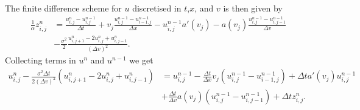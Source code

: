 \documentclass{article}  %
\begin{document}
The finite difference scheme for $u$ discretised in $t$,$x$, and $v$ is then given by 
%
\begin{align} 
    \frac{1}{\alpha}z^n_{i,j} &= \frac{u^n_{i,j}-u^{n-1}_{i,j}}{\Delta t} + v_j \frac{u^{n-1}_{i,j}-u^{n-1}_{i-1,j}}{\Delta x} - u^{n-1}_{i,j}a'(v_j) - a(v_j)\frac{u^{n-1}_{i,j}-u^{n-1}_{i,j-1}}{\Delta v}\\
     &- \frac{\sigma^2}{2}\frac{u^n_{i,j+1}-2u^n_{i,j}+u^n_{i,j-1}}{(\Delta v)^2}.
\end{align}
%
Collecting terms in $u^n$ and $u^{n-1}$ we get
%
\begin{align} 
    \label{eq:finite-difference}
    u^n_{i,j} - \frac{\sigma^2\Delta t}{2(\Delta v)^2}(u^n_{i,j+1}-2u^n_{i,j}+u^n_{i,j-1}) &= u^{n-1}_{i,j} - \frac{\Delta t}{\Delta x}v_j(u^{n-1}_{i,j}-u^{n-1}_{i-1,j}) + \Delta t a'(v_j) u^{n-1}_{i,j}\\ 
    &+ \frac{\Delta t}{\Delta v} a(v_j)(u^{n-1}_{i,j}-u^{n-1}_{i,j-1}) + \Delta t z^{n}_{i,j}.
\end{align}
%
\end{document}
